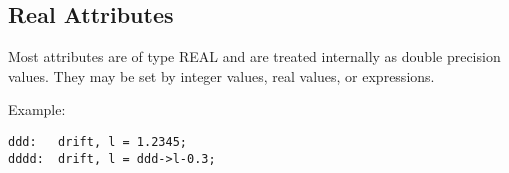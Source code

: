 
\subsection{Real Attributes}

Most attributes are of type REAL and are treated internally as double
precision values. They may be set by integer values, real values,  or
expressions. 

Example:  
\begin{verbatim}
ddd:   drift, l = 1.2345;
dddd:  drift, l = ddd->l-0.3;
\end{verbatim}

